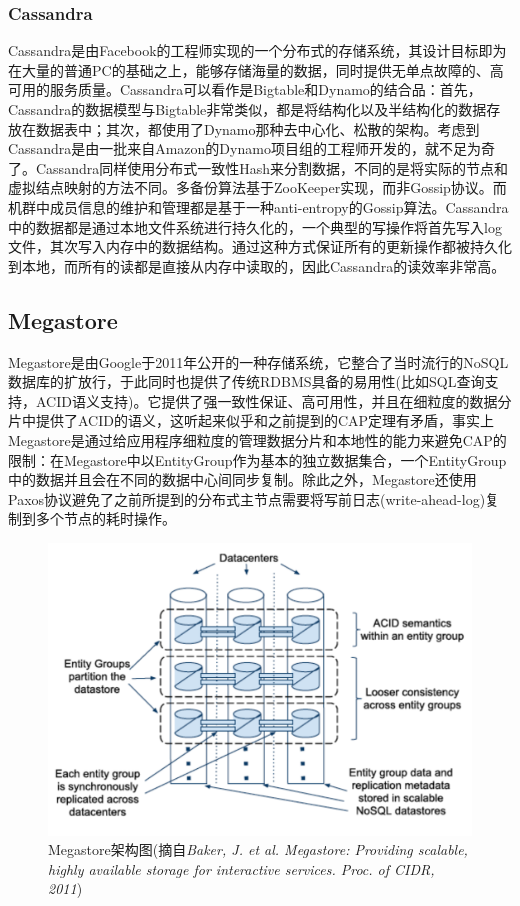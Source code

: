 \subsubsection{Cassandra}
  Cassandra是由Facebook的工程师实现的一个分布式的存储系统，其设计目标即为在大量的普通PC的基础之上，能够存储海量的数据，同时提供无单点故障的、高可用的服务质量。Cassandra可以看作是Bigtable和Dynamo的结合品：首先，Cassandra的数据模型与Bigtable非常类似，都是将结构化以及半结构化的数据存放在数据表中；其次，都使用了Dynamo那种去中心化、松散的架构。考虑到Cassandra是由一批来自Amazon的Dynamo项目组的工程师开发的，就不足为奇了。Cassandra同样使用分布式一致性Hash来分割数据，不同的是将实际的节点和虚拟结点映射的方法不同。多备份算法基于ZooKeeper实现，而非Gossip协议。而机群中成员信息的维护和管理都是基于一种anti-entropy的Gossip算法。Cassandra中的数据都是通过本地文件系统进行持久化的，一个典型的写操作将首先写入log文件，其次写入内存中的数据结构。通过这种方式保证所有的更新操作都被持久化到本地，而所有的读都是直接从内存中读取的，因此Cassandra的读效率非常高。


\subsection{Megastore}
Megastore是由Google于2011年公开的一种存储系统，它整合了当时流行的NoSQL数据库的扩放行，于此同时也提供了传统RDBMS具备的易用性(比如SQL查询支持，ACID语义支持)。它提供了强一致性保证、高可用性，并且在细粒度的数据分片中提供了ACID的语义，这听起来似乎和之前提到的CAP定理有矛盾，事实上Megastore是通过给应用程序细粒度的管理数据分片和本地性的能力来避免CAP的限制：在Megastore中以EntityGroup作为基本的独立数据集合，一个EntityGroup中的数据并且会在不同的数据中心间同步复制。除此之外，Megastore还使用Paxos协议避免了之前所提到的分布式主节点需要将写前日志(write-ahead-log)复制到多个节点的耗时操作。

\begin{figure}[]
\centering
\includegraphics[width=5in]{../figures/megastore.pdf}
\caption{Megastore架构图(摘自\textit{Baker, J. et al. Megastore: Providing scalable, highly available storage for interactive services. Proc. of CIDR, 2011})}
\label{fig:megastore}
\end{figure}

